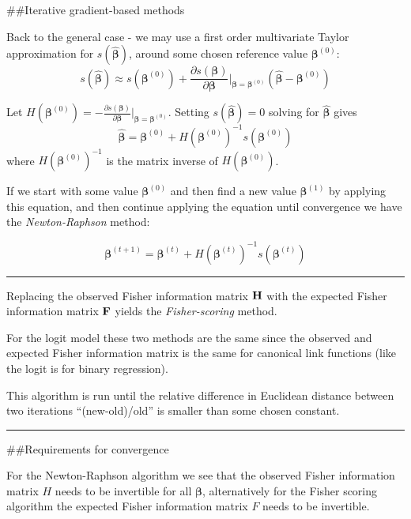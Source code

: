 \documentclass[
]{article}
\begin{document}
\#\#Iterative gradient-based methods

Back to the general case - we may use a first order multivariate Taylor
approximation for \(s(\hat{\boldsymbol{\beta}})\), around some chosen
reference value \(\boldsymbol{\beta}^{(0)}\):
\[s(\hat{\boldsymbol{\beta}})\approx s(\boldsymbol{\beta}^{(0)})+\frac{\partial s(\boldsymbol{\beta})}{\partial \boldsymbol{\beta}}\big\rvert_{\boldsymbol{\beta}=\boldsymbol{\beta}^{(0)}} (\hat{\boldsymbol{\beta}}-\boldsymbol{\beta}^{(0)})\]

Let
\(H(\boldsymbol{\beta}^{(0)})=-\frac{\partial s(\boldsymbol{\beta})}{\partial \boldsymbol{\beta}}\big\rvert_{\boldsymbol{\beta}=\boldsymbol{\beta}^{(0)}}\).
Setting \(s(\hat{\boldsymbol{\beta}})=0\) solving for
\(\hat{\boldsymbol{\beta}}\) gives
\[ \hat{\boldsymbol{\beta}}=\boldsymbol{\beta}^{(0)} + H(\boldsymbol{\beta}^{(0)})^{-1} s(\boldsymbol{\beta}^{(0)})\]
where \(H(\boldsymbol{\beta}^{(0)})^{-1}\) is the matrix inverse of
\(H(\boldsymbol{\beta}^{(0)})\).

If we start with some value \(\boldsymbol{\beta}^{(0)}\) and then find a
new value \(\boldsymbol{\beta}^{(1)}\) by applying this equation, and
then continue applying the equation until convergence we have the
\emph{Newton-Raphson} method:

\[\boldsymbol{\beta}^{(t+1)}=\boldsymbol{\beta}^{(t)} + H(\boldsymbol{\beta}^{(t)})^{-1} s(\boldsymbol{\beta}^{(t)})\]

\begin{center}\rule{0.5\linewidth}{0.5pt}\end{center}

Replacing the observed Fisher information matrix \({\bf H}\) with the
expected Fisher information matrix \({\bf F}\) yields the
\emph{Fisher-scoring} method.

For the logit model these two methods are the same since the observed
and expected Fisher information matrix is the same for canonical link
functions (like the logit is for binary regression).

This algorithm is run until the relative difference in Euclidean
distance between two iterations ``(new-old)/old'' is smaller than some
chosen constant.

\begin{center}\rule{0.5\linewidth}{0.5pt}\end{center}

\#\#Requirements for convergence

For the Newton-Raphson algorithm we see that the observed Fisher
information matrix \(H\) needs to be invertible for all
\(\boldsymbol{\beta}\), alternatively for the Fisher scoring algorithm
the expected Fisher information matrix \(F\) needs to be invertible.
\end{document}
